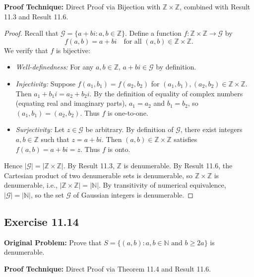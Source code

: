 \documentclass[11pt, letterpaper]{article}
\theoremstyle{definition}
\theoremstyle{remark}
\begin{document}
\textbf{Proof Technique:} Direct Proof via Bijection with $\mathbb{Z} \times \mathbb{Z}$, combined with Result 11.3 and Result 11.6.

\begin{proof}
Recall that $\mathcal{G} = \{a + bi : a, b \in \mathbb{Z}\}$. Define a function $f : \mathbb{Z} \times \mathbb{Z} \to \mathcal{G}$ by
\[
f(a, b) = a + bi \quad \text{for all } (a, b) \in \mathbb{Z} \times \mathbb{Z}.
\]
We verify that $f$ is bijective:
\begin{itemize}
    \item \emph{Well-definedness:} For any $a, b \in \mathbb{Z}$, $a + bi \in \mathcal{G}$ by definition.
    \item \emph{Injectivity:} Suppose $f(a_1, b_1) = f(a_2, b_2)$ for $(a_1, b_1), (a_2, b_2) \in \mathbb{Z} \times \mathbb{Z}$. Then $a_1 + b_1 i = a_2 + b_2 i$. By the definition of equality of complex numbers (equating real and imaginary parts), $a_1 = a_2$ and $b_1 = b_2$, so $(a_1, b_1) = (a_2, b_2)$. Thus $f$ is one-to-one.
    \item \emph{Surjectivity:} Let $z \in \mathcal{G}$ be arbitrary. By definition of $\mathcal{G}$, there exist integers $a, b \in \mathbb{Z}$ such that $z = a + bi$. Then $(a, b) \in \mathbb{Z} \times \mathbb{Z}$ satisfies $f(a, b) = a + bi = z$. Thus $f$ is onto.
\end{itemize}
Hence $|\mathcal{G}| = |\mathbb{Z} \times \mathbb{Z}|$. By Result 11.3, $\mathbb{Z}$ is denumerable. By Result 11.6, the Cartesian product of two denumerable sets is denumerable, so $\mathbb{Z} \times \mathbb{Z}$ is denumerable, i.e., $|\mathbb{Z} \times \mathbb{Z}| = |\mathbb{N}|$. By transitivity of numerical equivalence, $|\mathcal{G}| = |\mathbb{N}|$, so the set $\mathcal{G}$ of Gaussian integers is denumerable.
\end{proof}

\subsection{Exercise 11.14}

\textbf{Original Problem:} Prove that $S = \{(a, b) : a, b \in \mathbb{N} \text{ and } b \ge 2a\}$ is denumerable.

\textbf{Proof Technique:} Direct Proof via Theorem 11.4 and Result 11.6.
\end{document}
